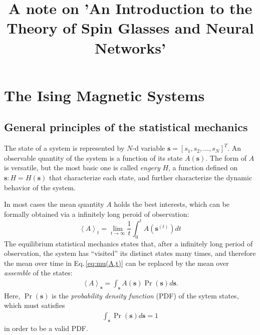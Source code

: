 \documentclass[11pt]{book}
\numberwithin{equation}{chapter}
\newcommand{\bs}{\boldsymbol}
\newcommand{\mean}[2]{\left\langle{#1}\right\rangle_{#2}}
\newcommand{\vs}{\bs{s}}
\begin{document}
\title{A note on 'An Introduction to the Theory of Spin Glasses and Neural Networks'}
\maketitle
{}
\clearpage
\chapter{The Ising Magnetic Systems}
\section{General principles of the statistical mechanics}
The state of a system is represented by $N$-d variable $\vs=[s_1, s_2, \dots, s_N]^T$. An observable quantity of the system is a function of its state $A(\vs)$. The form of $A$ is versatile, but the most basic one is called \textit{engery} $H$, a function defined on $\vs: H = H(\vs)$ that characterize each state, and further characterize the dynamic behavior of the system.

In most cases the mean quantity $A$ holds the best interests, which can be formally obtained via a infinitely long peroid of observation:
\begin{equation} \label{eq:mu(A,t)}
  \mean{A}{t} = \lim_{t \to \infty}\frac{1}{t} \int_0^t A(\vs^{(t)})  dt
\end{equation}
The equilibrium statistical mechanics states that, after a infinitely long period of observation, the system has ``visited'' its distinct states many times, and therefore the mean over time in Eq.\,\eqref{eq:mu(A,t)} can be replaced by the mean over \textit{assemble} of the states:
\begin{align}\label{eq:mu(A,s)}
  \mean{A}{\vs} = \int_{\vs} A(\vs)\Pr(\vs) d\vs.
\end{align}
Here, $\Pr(\vs)$ is the \textit{probability density function} (PDF) of the sytem states, which must satisfies
\begin{align}\label{eq:int(p)=1}
  \int_{\vs} \Pr(\vs) d\vs = 1
\end{align}
in order to be a valid PDF.
\end{document}
